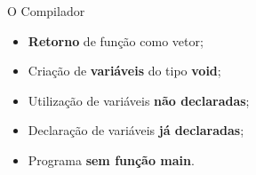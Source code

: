 \documentclass[aspectratio=169]{beamer}
\begin{document}
\begin{frame}{O Compilador}
{\begin{itemize}
				\vspace{0.5cm}
				
				\item \textbf{Retorno} de função como vetor;
				
				\vspace{0.5cm}
				
				\item Criação de \textbf{variáveis} do tipo \textbf{void};
				
				\vspace{0.5cm}
				
				\item Utilização de variáveis \textbf{não declaradas}; 
				
				\vspace{0.5cm}
				
				\item Declaração de variáveis \textbf{já declaradas};
				
				\vspace{0.5cm}
				
				\item Programa \textbf{sem função main}.
			\end{itemize}
		}
	\end{frame}
	
\end{document}
